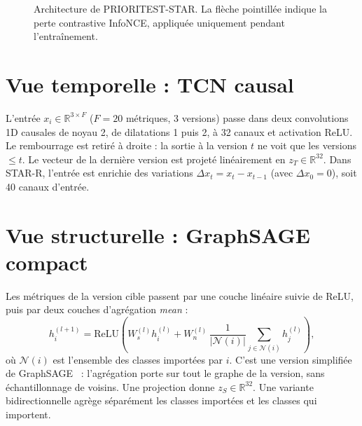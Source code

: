 \documentclass[11pt,a4paper,openany]{report}
\begin{document}
\begin{figure}[htbp]
{}
\caption{Architecture de PRIORITEST-STAR. La flèche pointillée indique la perte contrastive InfoNCE, appliquée
uniquement pendant l'entraînement.}
\label{fig:archi}
\end{figure}

\section{Vue temporelle : TCN causal}
L'entrée $x_i\in\mathbb{R}^{3\times F}$ ($F=20$ métriques, 3 versions) passe dans deux convolutions 1D causales de
noyau 2, de dilatations 1 puis 2, à 32 canaux et activation ReLU. Le rembourrage est retiré à droite : la sortie à la
version $t$ ne voit que les versions $\le t$. Le vecteur de la dernière version est projeté linéairement en
$z_T\in\mathbb{R}^{32}$. Dans STAR-R, l'entrée est enrichie des variations $\Delta x_t=x_t-x_{t-1}$ (avec
$\Delta x_0=0$), soit 40 canaux d'entrée.

\section{Vue structurelle : GraphSAGE compact}
Les métriques de la version cible passent par une couche linéaire suivie de ReLU, puis par deux couches d'agrégation
\emph{mean} :
\[
h_i^{(l+1)}=\mathrm{ReLU}\!\left(W_s^{(l)}h_i^{(l)}+W_n^{(l)}\,\frac{1}{|\mathcal{N}(i)|}\sum_{j\in\mathcal{N}(i)}h_j^{(l)}\right),
\]
où $\mathcal{N}(i)$ est l'ensemble des classes importées par $i$. C'est une version simplifiée de
GraphSAGE~\cite{hamilton2017} : l'agrégation porte sur tout le graphe de la version, sans échantillonnage de voisins.
Une projection donne $z_S\in\mathbb{R}^{32}$. Une variante bidirectionnelle agrège séparément les classes importées et
les classes qui importent.
\end{document}
